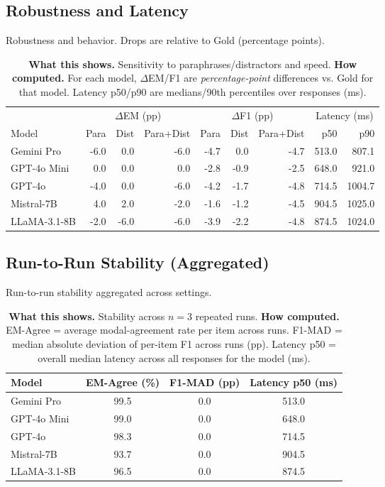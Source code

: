 \subsection{Robustness and Latency}
\begin{table}[H]\centering
\caption{Robustness and behavior. Drops are relative to Gold (percentage points).}
\label{tab:robustness-behavior}
\scriptsize
\setlength{\tabcolsep}{4pt}
\renewcommand{\arraystretch}{1.05}
\begin{tabular}{l rrr rrr rr}
\toprule
& \multicolumn{3}{c}{\(\Delta\)EM (pp)} & \multicolumn{3}{c}{\(\Delta\)F1 (pp)} & \multicolumn{2}{c}{Latency (ms)} \\
\cmidrule(lr){2-4}\cmidrule(lr){5-7}\cmidrule(lr){8-9}
Model & Para & Dist & Para+Dist & Para & Dist & Para+Dist & p50 & p90 \\
\midrule
Gemini Pro & -6.0 & 0.0 & -6.0 & -4.7 & 0.0 & -4.7 & 513.0 & 807.1 \\
GPT-4o Mini & 0.0 & 0.0 & 0.0 & -2.8 & -0.9 & -2.5 & 648.0 & 921.0 \\
GPT-4o & -4.0 & 0.0 & -6.0 & -4.2 & -1.7 & -4.8 & 714.5 & 1004.7 \\
Mistral-7B & 4.0 & 2.0 & -2.0 & -1.6 & -1.2 & -4.5 & 904.5 & 1025.0 \\
LLaMA-3.1-8B & -2.0 & -6.0 & -6.0 & -3.9 & -2.2 & -4.8 & 874.5 & 1024.0 \\
\bottomrule
\end{tabular}
\caption*{\scriptsize
\textbf{What this shows.} Sensitivity to paraphrases/distractors and speed.\;
\textbf{How computed.} For each model, $\Delta$EM/F1 are \emph{percentage-point} differences vs. Gold for that model. Latency p50/p90 are medians/90th percentiles over responses (ms).}
\end{table}

\subsection{Run-to-Run Stability (Aggregated)}
\begin{table}[H]\centering
\caption{Run-to-run stability aggregated across settings.}
\label{tab:stability}
\small
\setlength{\tabcolsep}{5pt}
\renewcommand{\arraystretch}{1.05}
\begin{tabular}{lccc}
\toprule
Model & EM-Agree (\%) & F1-MAD (pp) & Latency p50 (ms) \\
\midrule
Gemini Pro & 99.5 & 0.0 & 513.0 \\
GPT-4o Mini & 99.0 & 0.0 & 648.0 \\
GPT-4o & 98.3 & 0.0 & 714.5 \\
Mistral-7B & 93.7 & 0.0 & 904.5 \\
LLaMA-3.1-8B & 96.5 & 0.0 & 874.5 \\
\bottomrule
\end{tabular}
\caption*{\scriptsize
\textbf{What this shows.} Stability across $n=3$ repeated runs.\;
\textbf{How computed.} EM-Agree = average modal-agreement rate per item across runs. 
F1-MAD = median absolute deviation of per-item F1 across runs (pp). 
Latency p50 = overall median latency across all responses for the model (ms).}
\end{table}

